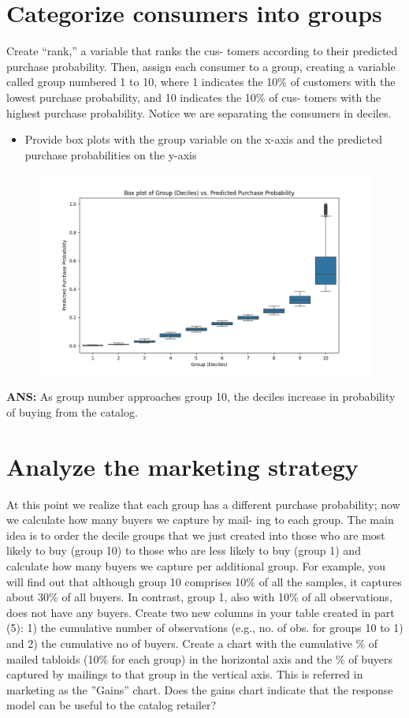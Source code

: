 \documentclass[a4paper,12pt]{article}
\begin{document}
\section{Categorize consumers into groups}
Create “rank,” a variable that ranks the cus-
tomers according to their predicted purchase probability. Then, assign each consumer
to a group, creating a variable called group numbered 1 to 10, where 1 indicates the
10\% of customers with the lowest purchase probability, and 10 indicates the 10\% of cus-
tomers with the highest purchase probability. Notice we are separating the consumers
in deciles.
\begin{itemize}
\item Provide box plots with the group variable on the x-axis and the predicted purchase
probabilities on the y-axis
\end{itemize}
\begin{figure}[H]
\centering
\includegraphics[width=1\textwidth]{figure_2.png}
\label{Box Plots of Actual Purchase Decision and Predicted Purchase Probability}
\end{figure}
\textbf{ANS:} 
As group number approaches group 10, the deciles increase in probability of buying
from the catalog. 

\section{Analyze the marketing strategy}
At this point we realize that each group has a
different purchase probability; now we calculate how many buyers we capture by mail-
ing to each group. The main idea is to order the decile groups that we just created into
those who are most likely to buy (group 10) to those who are less likely to buy (group
1) and calculate how many buyers we capture per additional group. For example, you
will find out that although group 10 comprises 10\% of all the samples, it captures
about 30\% of all buyers. In contrast, group 1, also with 10\% of all observations, does
not have any buyers.
Create two new columns in your table created in part (5): 1) the cumulative number of
observations (e.g., no. of obs. for groups 10 to 1) and 2) the cumulative no of buyers.
Create a chart with the cumulative \% of mailed tabloids (10\% for each group) in the
horizontal axis and the \% of buyers captured by mailings to that group in the vertical
axis. This is referred in marketing as the ”Gains” chart. Does the gains chart indicate
that the response model can be useful to the catalog retailer?
\end{document}
